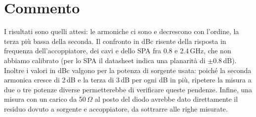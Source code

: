 \documentclass[11pt,a4paper,oneside]{book}
\begin{document}
\section{Commento}
I risultati sono quelli attesi: le armoniche ci sono e decrescono con l'ordine, la terza più bassa della seconda. Il confronto in dBc risente della risposta in frequenza dell'accoppiatore, dei cavi e dello SPA fra 0.8 e 2.4\,GHz, che non abbiamo calibrato (per lo SPA il datasheet indica una planarità di $\pm 0.8$\,dB). Inoltre i valori in dBc valgono per la potenza di sorgente usata: poiché la seconda armonica cresce di 2\,dB e la terza di 3\,dB per ogni dB in più, ripetere la misura a due o tre potenze diverse permetterebbe di verificare queste pendenze. Infine, una misura con un carico da 50\,$\Omega$ al posto del diodo avrebbe dato direttamente il residuo dovuto a sorgente e accoppiatore, da sottrarre alle righe misurate.
\end{document}
